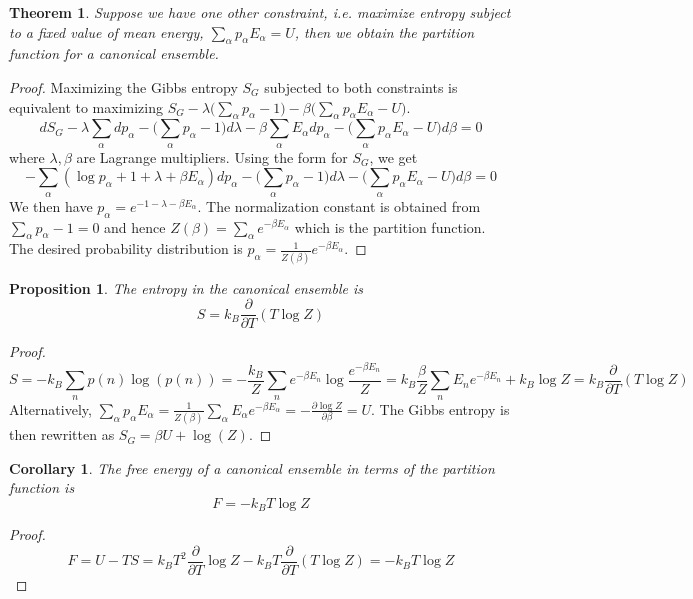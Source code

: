 \documentclass[a4paper]{article}
\theoremstyle{new}
\newtheorem{thm}{Theorem}[section]
\newtheorem{prop}{Proposition}[section]
\newtheorem{cor}{Corollary}[section]
\begin{document}
\begin{thm}
Suppose we have one other constraint, i.e. maximize entropy subject to a fixed value of mean energy, $\sum_\alpha p_\alpha E_\alpha=U$, then we obtain the partition function for a canonical ensemble.
\end{thm}
\begin{proof}
Maximizing the Gibbs entropy $S_G$ subjected to both constraints is equivalent to maximizing $S_G-\lambda\bigg(\sum_\alpha p_\alpha -1\bigg)-\beta\bigg(\sum_\alpha p_\alpha E_\alpha -U\bigg)$.
$$ dS_G-\lambda\sum_\alpha dp_\alpha-\bigg(\sum_\alpha p_\alpha-1\bigg)d\lambda-\beta\sum_\alpha E_\alpha dp_\alpha-\bigg(\sum_\alpha p_\alpha E_\alpha -U\bigg)d\beta=0$$
where $\lambda,\beta$ are Lagrange multipliers. Using the form for $S_G$, we get
$$-\sum_\alpha(\log p_\alpha+1+\lambda+\beta E_\alpha)dp_\alpha-\bigg(\sum_\alpha p_\alpha-1\bigg)d\lambda-\bigg(\sum_\alpha p_\alpha E_\alpha -U\bigg)d\beta=0$$
We then have $p_\alpha =e^{-1-\lambda-\beta E_\alpha}$. The normalization constant is obtained from $\sum_\alpha p_\alpha-1=0$ and hence $Z(\beta)=\sum_\alpha e^{-\beta E_\alpha}$ which is the partition function. The desired probability distribution is $p_\alpha=\frac{1}{Z(\beta)}e^{-\beta E_\alpha}$. 
\end{proof}
\begin{prop}
The entropy in the canonical ensemble is
$$S=k_B\frac{\partial}{\partial T}(T\log Z)$$
\end{prop}
\begin{proof}
$$S=-k_B\sum_np(n)\log(p(n))=-\frac{k_B}{Z}\sum_ne^{-\beta E_n}\log\frac{e^{-\beta E_n}}{Z}=k_B\frac{\beta}{Z}\sum_nE_ne^{-\beta E_n}+k_B\log Z=k_B\frac{\partial}{\partial T}(T\log Z)$$
Alternatively, $\sum_\alpha p_\alpha E_\alpha=\frac{1}{Z(\beta)}\sum_\alpha E_\alpha e^{-\beta E_\alpha}=-\frac{\partial\log Z}{\partial\beta}=U$. The Gibbs entropy is then rewritten as $S_G=\beta U+\log(Z)$.
\end{proof}
\begin{cor}
The free energy of a canonical ensemble in terms of the partition function is 
$$F=-k_BT\log Z$$
\end{cor}
\begin{proof}
$$F=U-TS=k_BT^2\frac{\partial}{\partial T}\log Z-k_BT\frac{\partial}{\partial T}(T\log Z)=-k_BT\log Z$$
\end{proof}
\end{document}
